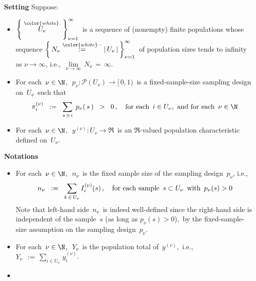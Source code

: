 \vskip 0.5cm
\begin{theorem}\label{AsymptoticsHTForDomainTotal}
\mbox{}
\vskip 0.05cm
\noindent
\textbf{Setting}
\vskip 0.1cm
\noindent
Suppose:
\begin{itemize}
\item
    $\left\{\;\overset{{\color{white}.}}{U_{\nu}}\;\right\}_{\nu=1}^{\infty}$\,
    is a sequence of (nonempty) finite populations whose sequence
    $\left\{\,N_{\nu} \overset{{\color{white}-}}{:=} \vert\,U_{\nu}\,\vert\,\right\}_{\nu=1}^{\infty}$\,
    of population sizes tends to infinity as $\nu \rightarrow \infty$, i.e.,
    \,$\underset{\nu\rightarrow\infty}{\lim}\,N_{\nu} \,=\, \infty$.\,
\item
    For each \,$\nu \in \N$,\,
    \,$p_{\nu} : \mathcal{P}(U_{\nu}) \longrightarrow [\,0,1)$\,
    is a {\color{red}fixed-sample-size} sampling design on \,$U_{\nu}$\,
    such that
    \begin{equation*}
    \pi^{(\nu)}_{i}
    \;\; := \;\;
        \underset{s\,\ni\,i}{\sum}\;\,
        p_{\nu}\!\left(\,s\,\right)
    \;\; > \;\;
        0\,,
    \quad
    \textnormal{for each \,$i \in U_{\nu}$,\, and for each \,$\nu\in\N$}
    \end{equation*}
\item
    For each \,$\nu \in \N$,\,
    \,$y^{(\nu)} : U_{\nu} \longrightarrow \Re$\,
    is an $\Re$-valued population characteristic defined on \,$U_{\nu}$.\,
\end{itemize}
\vskip 0.2cm
\noindent
\textbf{Notations}
\begin{itemize}
\item
    For each \,$\nu\in\N$,\,
    \,$n_{\nu}$\, is the fixed sample size of the sampling design \,$p_{\nu}$, i.e.,\,
    \begin{equation*}
    n_{\nu}
    \;\; := \;\;
        \underset{k\,\in\,U_{\nu}}{\sum}\,I^{(\nu)}_{i}(s)\,,
    \quad
    \textnormal{for each sample \,$s \subset U_{\nu}$\, with \,$p_{\nu}(s) > 0$}
    \end{equation*}
    Note that left-hand side \,$n_{\nu}$\, is indeed well-defined
    since the right-hand side is independent of the sample \,$s$ (as long as $p_{\nu}(s) > 0$),\,
    by the fixed-sample-size assumption on the sampling design \,$p_{\nu}$.
\item
    For each \,$\nu\in\N$,\,
    \,$Y_{\nu}$\, is the population total of \,$y^{(\nu)}$,\, i.e.,
    \;$
    Y_{\nu}
    \;\, := \,
        \underset{i \in U_{\nu}}{\sum}\,y^{(\nu)}_{i}
    $.\,
\item

\end{itemize}
\end{theorem}
